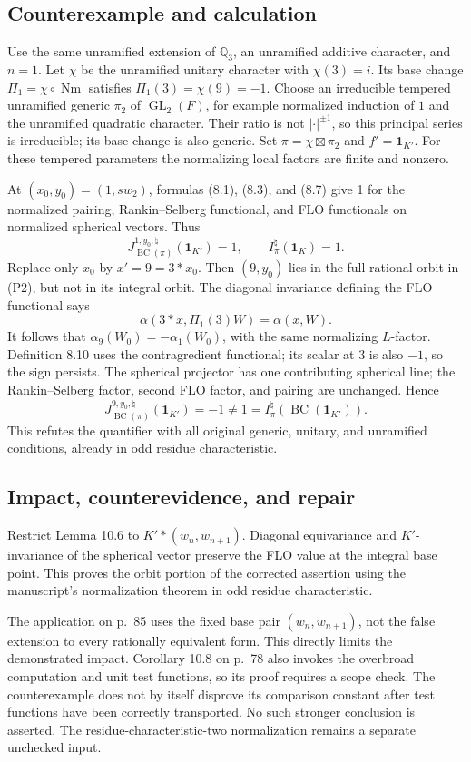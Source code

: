 \documentclass[10pt]{article}
\begin{document}
\subsection*{Counterexample and calculation}
Use the same unramified extension of \(\mathbb Q_3\), an unramified additive character, and \(n=1\). Let \(\chi\) be the unramified unitary character with \(\chi(3)=i\). Its base change \(\Pi_1=\chi\circ\operatorname{Nm}\) satisfies \(\Pi_1(3)=\chi(9)=-1\). Choose an irreducible tempered unramified generic \(\pi_2\) of \(\operatorname{GL}_2(F)\), for example normalized induction of \(1\) and the unramified quadratic character. Their ratio is not \(|\cdot|^{\pm1}\), so this principal series is irreducible; its base change is also generic. Set \(\pi=\chi\boxtimes\pi_2\) and \(f'=\mathbf 1_{K'}\). For these tempered parameters the normalizing local factors are finite and nonzero.\par
At \((x_0,y_0)=(1,sw_2)\), formulas (8.1), (8.3), and (8.7) give 1 for the normalized pairing, Rankin–Selberg functional, and FLO functionals on normalized spherical vectors. Thus \[J^{1,y_0,\natural}_{\operatorname{BC}(\pi)}(\mathbf 1_{K'})=1,\qquad
 I^\natural_\pi(\mathbf 1_K)=1.\] Replace only \(x_0\) by \(x'=9=3*x_0\). Then \((9,y_0)\) lies in the full rational orbit in (P2), but not in its integral orbit. The diagonal invariance defining the FLO functional says \[\alpha(3*x,\Pi_1(3)W)=\alpha(x,W).\] It follows that \(\alpha_9(W_0)=-\alpha_1(W_0)\), with the same normalizing \(L\)-factor. Definition 8.10 uses the contragredient functional; its scalar at 3 is also \(-1\), so the sign persists. The spherical projector has one contributing spherical line; the Rankin–Selberg factor, second FLO factor, and pairing are unchanged. Hence \[J^{9,y_0,\natural}_{\operatorname{BC}(\pi)}(\mathbf 1_{K'})
       =-1\ne1=I^\natural_\pi(\operatorname{BC}(\mathbf 1_{K'})).\] This refutes the quantifier with all original generic, unitary, and unramified conditions, already in odd residue characteristic.\par
\subsection*{Impact, counterevidence, and repair}
Restrict Lemma 10.6 to \(K'*(w_n,w_{n+1})\). Diagonal equivariance and \(K'\)-invariance of the spherical vector preserve the FLO value at the integral base point. This proves the orbit portion of the corrected assertion using the manuscript’s normalization theorem in odd residue characteristic.\par
The application on p. 85 uses the fixed base pair \((w_n,w_{n+1})\), not the false extension to every rationally equivalent form. This directly limits the demonstrated impact. Corollary 10.8 on p. 78 also invokes the overbroad computation and unit test functions, so its proof requires a scope check. The counterexample does not by itself disprove its comparison constant after test functions have been correctly transported. No such stronger conclusion is asserted. The residue-characteristic-two normalization remains a separate unchecked input.\par
\end{document}
